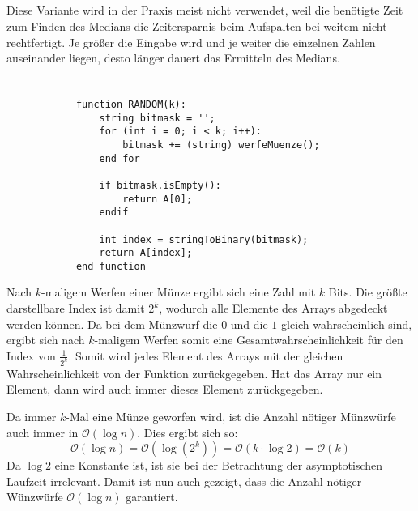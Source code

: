 \documentclass[10pt,a4paper,oneside,ngerman,numbers=noenddot]{scrartcl}
\begin{document}
	\subsection{} %
		Diese Variante wird in der Praxis meist nicht verwendet, weil die benötigte Zeit zum Finden des Medians die Zeitersparnis beim Aufspalten bei weitem nicht rechtfertigt. Je größer die Eingabe wird und je weiter die einzelnen Zahlen auseinander liegen, desto länger dauert das Ermitteln des Medians.
	\subsection{} %
\section{} %
	\subsection{} %
		\begin{verbatim}
			function RANDOM(k):
			    string bitmask = '';
			    for (int i = 0; i < k; i++):
			        bitmask += (string) werfeMuenze();
			    end for
			    
			    if bitmask.isEmpty():
			        return A[0];
			    endif
			    
			    int index = stringToBinary(bitmask);
			    return A[index];
			end function
		\end{verbatim}
		Nach $k$-maligem Werfen einer Münze ergibt sich eine Zahl mit $k$ Bits. Die größte darstellbare Index ist damit $2^{k}$, wodurch alle Elemente des Arrays abgedeckt werden können. Da bei dem Münzwurf die $0$ und die $1$ gleich wahrscheinlich sind, ergibt sich nach $k$-maligem Werfen somit eine Gesamtwahrscheinlichkeit für den Index von $\frac{1}{2^{k}}$. Somit wird jedes Element des Arrays mit der gleichen Wahrscheinlichkeit von der Funktion zurückgegeben. Hat das Array nur ein Element, dann wird auch immer dieses Element zurückgegeben.
		
		Da immer $k$-Mal eine Münze geworfen wird, ist die Anzahl nötiger Münzwürfe auch immer in $\mathcal{O}(\log n)$. Dies ergibt sich so:
		\[
			\mathcal{O}(\log n) = \mathcal{O}(\log(2^{k})) = \mathcal{O}(k \cdot \log 2) = \mathcal{O}(k)
		\]
		Da $\log 2$ eine Konstante ist, ist sie bei der Betrachtung der asymptotischen Laufzeit irrelevant. Damit ist nun auch gezeigt, dass die Anzahl nötiger Wünzwürfe $\mathcal{O}(\log n)$ garantiert.
	\subsection{} %
\end{document}
